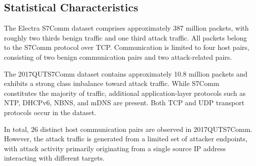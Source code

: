 \subsection{Statistical Characteristics}
The Electra S7Comm dataset comprises approximately 387 million packets,
with roughly two thirds benign traffic and one third attack traffic.
All packets belong to the S7Comm protocol over \ac{TCP}.
Communication is limited to four host pairs, consisting of two benign
communication pairs and two attack-related pairs.

The 2017QUTS7Comm dataset contains approximately 10.8 million packets
and exhibits a strong class imbalance toward attack traffic.
While S7Comm constitutes the majority of traffic, additional
application-layer protocols such as \ac{NTP}, DHCPv6, \ac{NBNS}, and \ac{mDNS} are present.
Both \ac{TCP} and \ac{UDP} transport protocols occur in the dataset.

In total, 26 distinct host communication pairs are observed in
2017QUTS7Comm. However, the attack traffic is generated from a limited
set of attacker endpoints, with attack activity primarily originating
from a single source IP address interacting with different targets.
